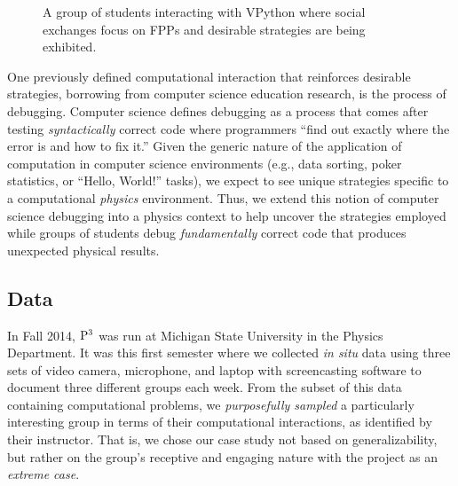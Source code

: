 \documentclass{msuphddissertation}
\begin{document}
\begin{doublespace}
\begin{figure}
\caption{A group of students interacting with VPython where social exchanges focus on FPPs and desirable strategies are being exhibited.}
\label{interactions}
\end{figure}

One previously defined computational interaction that reinforces desirable strategies,\cite{Murphy2008} borrowing from computer science education research, is the process of debugging.  Computer science defines debugging as a process that comes after testing \emph{syntactically} correct code where programmers ``find out exactly where the error is and how to fix it.''\cite{McCauley2008}  Given the generic nature of the application of computation in computer science environments (e.g., data sorting, poker statistics, or ``Hello, World!'' tasks), we expect to see unique strategies specific to a computational \emph{physics} environment.  Thus, we extend this notion of computer science debugging into a physics context to help uncover the strategies employed while groups of students debug \emph{fundamentally} correct code that produces unexpected physical results.

\subsection{Data}

In Fall 2014, ${\rm P}^{3}$ was run at Michigan State University in the Physics Department.  It was this first semester where we collected \emph{in situ} data using three sets of video camera, microphone, and laptop with screencasting software to document three different groups each week.  From the subset of this data containing computational problems, we \emph{purposefully sampled} a particularly interesting group in terms of their computational interactions, as identified by their instructor.  That is, we chose our case study not based on generalizability, but rather on the group's receptive and engaging nature with the project as an \emph{extreme case}.\cite{Flyvbjerg2006}


\end{doublespace}
\end{document}
